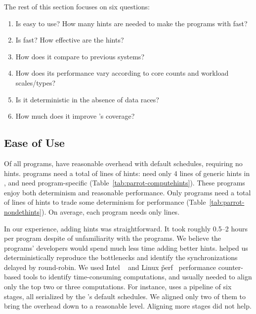 The rest of this section focuses on six questions:
\begin{enumerate}

\item[\S\ref{sec:parrot-ease-of-use}:] Is \parrot easy to use?  How many hints are
  needed to make the programs with \parrot fast?

\item[\S\ref{sec:parrot-performance}:] Is \parrot fast?  How effective are the
  hints?

\item[\S\ref{sec:parrot-comparison}:] How does it compare to previous systems?

\item[\S\ref{sec:parrot-sensitivity}:] How does its performance vary according
  to core counts and workload scales/types?

\item[\S\ref{sec:parrot-determinism}:] Is it deterministic in the absence of data races?

\item[\S\ref{sec:parrot-coverage}:] How much does it improve \dbug's coverage?

\end{enumerate}

\subsection{Ease of Use} \label{sec:parrot-ease-of-use}

Of all \nprog programs, \nprognohints have reasonable overhead with
default schedules, requiring no hints.  \nproglineuphints programs need a total of 
\nlineofcomputehints lines of \compute hints: \nproggenericlineuphints
need only 4 lines of generic \compute hints in \libgomp, and
\nprogspecificlineuphints need program-specific \computes
(Table~\ref{tab:parrot-computehints}).  These programs enjoy both determinism and
reasonable performance.  Only \nprognondethints programs 
need a total of \nlineofnondethints lines of \nondet hints to
trade some determinism for performance (Table~\ref{tab:parrot-nondethints}).
On average, each program needs only \hintsperprog lines.

In our experience, adding hints was straightforward.  It took roughly 0.5--2 hours per
program despite of unfamiliarity with the programs.  We believe
the programs' developers would spend much less time adding better hints.
\parrot helped us deterministically reproduce the bottlenecks and identify
the synchronizations delayed by round-robin.  We used Intel \vtune~\cite{vtune} and
Linux \v{perf}~\cite{perf} performance counter-based tools to identify time-consuming
computations, and usually needed to align only the top two or three
computations.  For instance, \ferret uses a pipeline of six stages, all
serialized by the \parrot's default schedules.  We aligned only two of them to bring
the overhead down to a reasonable level.  Aligning more stages did not help.

